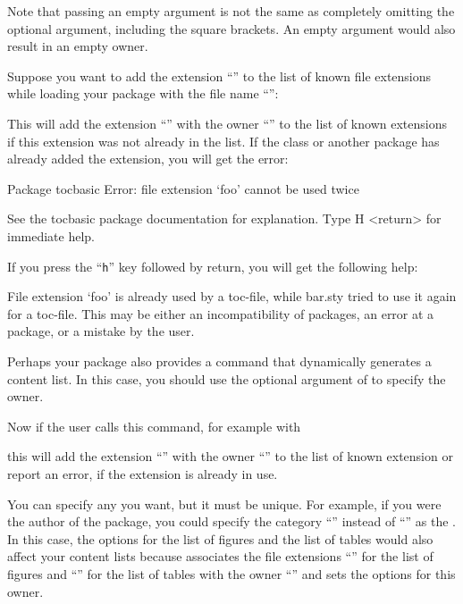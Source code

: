Note that passing an empty  argument is not
the same as completely omitting the optional argument, including the square
brackets. An empty argument would also result in an empty owner.
\begin{Example}
  Suppose you want to add the extension ``'' to the list of known
  file extensions while loading your package with the file name
  ``'':
\begin{lstcode}
\end{lstcode}%
  This will add the extension ``'' with the owner
  ``'' to the list of known extensions if this extension was
  not already in the list. If the class or another package has already added
  the extension, you will get the error:
\begin{lstoutput}
  Package tocbasic Error: file extension `foo' cannot be used twice

  See the tocbasic package documentation for explanation.
  Type  H <return>  for immediate help.
\end{lstoutput}
  If you press the ``\texttt{h}'' key followed by return, you will get the
  following help:
\begin{lstoutput}
  File extension `foo' is already used by a toc-file, while bar.sty
  tried to use it again for a toc-file.
  This may be either an incompatibility of packages, an error at a package,
  or a mistake by the user.
\end{lstoutput}

  Perhaps your package also provides a command that dynamically generates a
  content list. In this case, you should use the optional argument of
   to specify the owner.
\begin{lstcode}
  \newcommand*{\createnewlistofsomething}[1]{%
    \addtotoclist[bar.sty]{#1}%
  }
\end{lstcode}
  Now if the user calls this command, for example with
\begin{lstcode}
\end{lstcode}
  this will add the extension ``'' with the owner
  ``'' to the list of known extension or report an error, if
  the extension is already in use.
\end{Example}
You can specify any  you want, but it must be unique. For
example, if you were the author of the  package, you could
specify the category ``'' instead of ``'' as
the . In this case, the \KOMAScript{}
options%
 for the list of figures and the list of
tables would also affect your content lists because \KOMAScript{} associates
the file extensions ``'' for the list of figures and
``'' for the list of tables with the owner ``'' and
sets the options for this owner.

